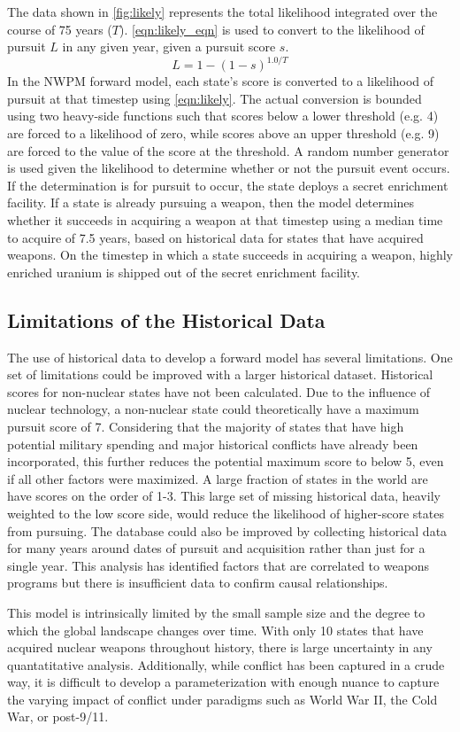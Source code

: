 The data shown in \ref{fig:likely} represents the total likelihood integrated over the course of 75 years ($T$). \ref{eqn:likely_eqn} is used to convert to the likelihood of pursuit $L$ in any given year, given a pursuit score $s$.
\begin{equation}
L = 1 - (1 - s)^{1.0/T}
\label{eqn:likely_eqn}
\end{equation}
In the \gls{NWPM} forward model, each state's score is converted to a likelihood of pursuit at that timestep using \ref{eqn:likely}. The actual conversion is bounded using two heavy-side functions such that scores below a lower threshold (e.g. 4) are forced to a likelihood of zero, while scores above an upper threshold (e.g. 9) are forced to the value of the score at the threshold.   A random number generator is used given the likelihood to determine whether or not the pursuit event occurs. If the determination is for pursuit to occur, the state deploys a secret enrichment facility. If a state is already pursuing a weapon, then the model determines whether it succeeds in acquiring a weapon at that timestep using a median time to acquire of 7.5 years, based on historical data for states that have acquired weapons. On the timestep in which a state succeeds in acquiring a weapon, highly enriched uranium is shipped out of the secret enrichment facility.

\subsection{Limitations of the Historical Data}
The use of historical data to develop a forward model has several limitations. One set of limitations could be improved with a larger historical dataset.  Historical scores for non-nuclear states have not been calculated. Due to the influence of nuclear technology, a non-nuclear state could theoretically have a maximum pursuit score of 7. Considering that the majority of states that have high potential military spending and major historical conflicts have already been incorporated, this further reduces the potential maximum score to below 5, even if all other factors were maximized.  A large fraction of states in the world are have scores on the order of 1-3.  This large set of missing historical data, heavily weighted to the low score side, would reduce the likelihood of higher-score states from pursuing.  The database could also be improved by collecting historical data for many years around dates of pursuit and acquisition rather than just for a single year. This analysis has identified factors that are correlated to weapons programs but there is insufficient data to confirm causal relationships.   

This model is intrinsically limited by the small sample size and the degree to which the global landscape changes over time. With only 10 states that have acquired nuclear weapons throughout history, there is large uncertainty in any quantatitative analysis. Additionally, while conflict has been captured in a crude way, it is difficult to develop a parameterization with enough nuance to capture the varying impact of conflict under paradigms such as World War II, the Cold War, or post-9/11.


